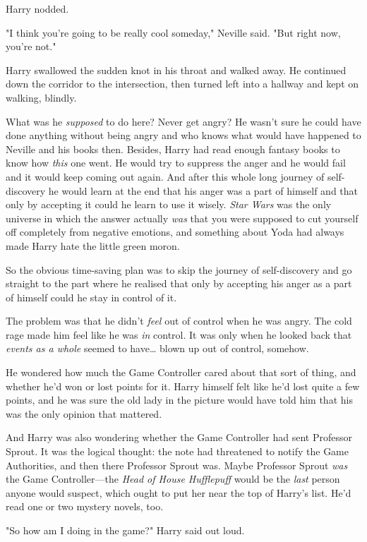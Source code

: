 Harry nodded.

"I think you're going to be really cool someday," Neville said. "But right now,
you're not."

Harry swallowed the sudden knot in his throat and walked away. He continued
down the corridor to the intersection, then turned left into a hallway and kept
on walking, blindly.

What was he \emph{supposed} to do here? Never get angry? He wasn't sure he
could have done anything without being angry and who knows what would have
happened to Neville and his books then. Besides, Harry had read enough fantasy
books to know how \emph{this} one went. He would try to suppress the anger and
he would fail and it would keep coming out again. And after this whole long
journey of self-discovery he would learn at the end that his anger was a part
of himself and that only by accepting it could he learn to use it wisely.
\emph{Star Wars} was the only universe in which the answer actually \emph{was}
that you were supposed to cut yourself off completely from negative emotions,
and something about Yoda had always made Harry hate the little green moron.

So the obvious time-saving plan was to skip the journey of self-discovery and
go straight to the part where he realised that only by accepting his anger as a
part of himself could he stay in control of it.

The problem was that he didn't \emph{feel} out of control when he was angry.
The cold rage made him feel like he was \emph{in} control. It was only when he
looked back that \emph{events as a whole} seemed to have{\ldots} blown up out
of control, somehow.

He wondered how much the Game Controller cared about that sort of thing, and
whether he'd won or lost points for it. Harry himself felt like he'd lost quite
a few points, and he was sure the old lady in the picture would have told him
that his was the only opinion that mattered.

And Harry was also wondering whether the Game Controller had sent Professor
Sprout. It was the logical thought: the note had threatened to notify the Game
Authorities, and then there Professor Sprout was. Maybe Professor Sprout
\emph{was} the Game Controller---the \emph{Head of House Hufflepuff} would be
the \emph{last} person anyone would suspect, which ought to put her near the
top of Harry's list. He'd read one or two mystery novels, too.

"So how am I doing in the game?" Harry said out loud.

